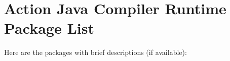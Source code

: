\section{Action Java Compiler Runtime Package List}
Here are the packages with brief descriptions (if available):\begin{CompactList}
\item{}
\item{}
\item{}
\end{CompactList}
